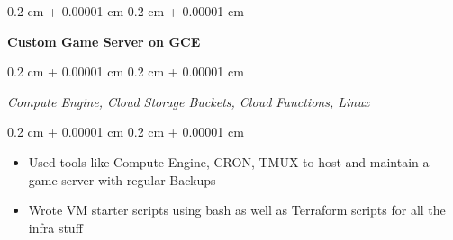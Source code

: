 \documentclass[10pt, letterpaper]{article}
\newenvironment{highlights}{
    \begin{itemize}[
        topsep=0.10 cm,
        parsep=0.10 cm,
        partopsep=0pt,
        itemsep=0pt,
        leftmargin=0.4 cm + 10pt
    ]
}{
    \end{itemize}
} %
\newenvironment{onecolentry}{
    \begin{adjustwidth}{
        0.2 cm + 0.00001 cm
    }{
        0.2 cm + 0.00001 cm
    }
}{
    \end{adjustwidth}
} %
\newenvironment{twocolentry}[2][]{
    \onecolentry
    \def\secondColumn{#2}
    \setcolumnwidth{\fill, 4.5 cm}
    \begin{paracol}{2}
}{
    \switchcolumn \raggedleft \secondColumn
    \end{paracol}
    \endonecolentry
} %
\begin{document}
\vspace{0.2 cm}

\begin{twocolentry}        {

        \textit{}}
    \textbf{Custom Game Server on GCE}
\end{twocolentry}

\begin{onecolentry}
    \textit{Compute Engine, Cloud Storage Buckets, Cloud Functions, Linux}
\end{onecolentry}
\vspace{0.2 cm}
\begin{onecolentry}
    \begin{highlights}
        \item {Used tools like Compute Engine, CRON, TMUX to host and maintain a game server with regular Backups}
        \item Wrote VM starter scripts using bash as well as Terraform scripts for all the
        infra stuff
    \end{highlights}
\end{onecolentry}

\vspace{0.2 cm}
\end{document}
